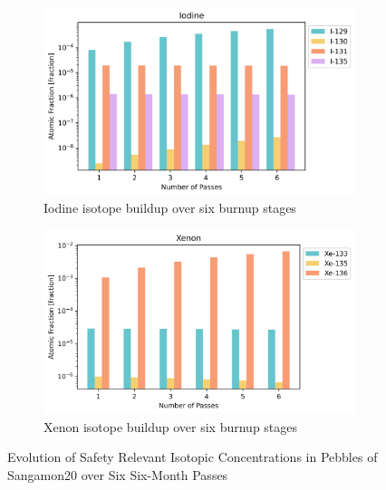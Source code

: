 \begin{figure}[H]
\centering
%
\begin{subfigure}{0.95\textwidth}
  \includegraphics[width=\linewidth]{figures/compositions/iodine}
  \caption{Iodine isotope buildup over six burnup stages}
  \label{fig:i}
\end{subfigure}%

\begin{subfigure}{0.95\textwidth}
  \includegraphics[width=\linewidth]{figures/compositions/xenon}
  \caption{Xenon isotope buildup over six burnup stages}
  \label{fig:xe}
\end{subfigure}%

\caption{Evolution of Safety Relevant Isotopic Concentrations in Pebbles of Sangamon20 over Six Six-Month Passes}
\end{figure}

